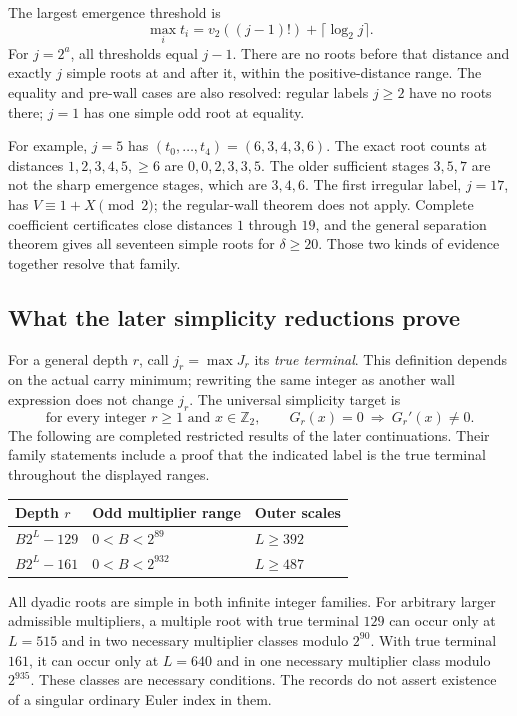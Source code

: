 The largest emergence threshold is
\[
 \max_i t_i=v_2((j-1)!)+\lceil\log_2 j\rceil.
\]
For $j=2^a$, all thresholds equal $j-1$. There are no roots before
that distance and exactly $j$ simple roots at and after it, within the
positive-distance range. The equality and pre-wall cases are also
resolved: regular labels $j\ge2$ have no roots there; $j=1$ has one
simple odd root at equality.

For example, $j=5$ has $(t_0,\ldots,t_4)=(6,3,4,3,6)$.
The exact root counts at distances $1,2,3,4,5,\ge6$ are
$0,0,2,3,3,5$. The older sufficient stages $3,5,7$ are not the
sharp emergence stages, which are $3,4,6$.
The first irregular label, $j=17$, has $V\equiv1+X\pmod2$;
the regular-wall theorem does not apply. Complete coefficient
certificates close distances $1$ through $19$, and the general separation
theorem gives all seventeen simple roots for $\delta\ge20$.
Those two kinds of evidence together resolve that family.

\subsection{What the later simplicity reductions prove}
\label{app:root:families}

For a general depth $r$, call $j_r=\max J_r$ its \emph{true terminal}.
This definition depends on the actual carry minimum; rewriting the same
integer as another wall expression does not change $j_r$.
The universal simplicity target is
\begin{equation}
 \text{for every integer }r\ge1\text{ and }x\in\mathbb Z_2,
 \qquad G_r(x)=0\ \Longrightarrow\ G_r'(x)\ne0.
 \label{eq:root:simplicitytarget}
\end{equation}
The following are completed restricted results of the later continuations.
Their family statements include a proof that the indicated label is the
true terminal throughout the displayed ranges.

\begin{center}
\begin{tabular}{lll}
\toprule
Depth $r$ & Odd multiplier range & Outer scales\\
\midrule
$B2^L-129$ & $0<B<2^{89}$ & $L\ge392$\\
$B2^L-161$ & $0<B<2^{932}$ & $L\ge487$\\
\bottomrule
\end{tabular}
\end{center}
All dyadic roots are simple in both infinite integer families.
For arbitrary larger admissible multipliers, a multiple root with true
terminal $129$ can occur only at $L=515$ and in two necessary multiplier
classes modulo $2^{90}$. With true terminal $161$, it can occur only at
$L=640$ and in one necessary multiplier class modulo $2^{935}$.
These classes are necessary conditions. The records do not assert
existence of a singular ordinary Euler index in them.

